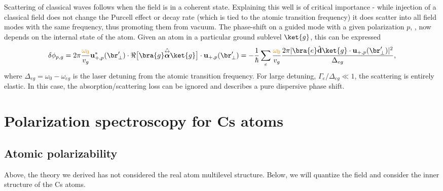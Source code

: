 \documentclass[]{report}
\newcommand{\tensor}[1]{\overset{\leftrightarrow}{#1}} %
\newcommand{\comment}[1]{{\color{orange} #1}}
\begin{document}
Scattering of classical waves follows when the field is in a coherent state.  \comment{Explaining this well is of critical importance - while injection of a classical field does not change the Purcell effect or decay rate (which is tied to the atomic transition frequency) it does scatter into all field modes with the same frequency, thus promoting them from vacuum}.  The phase-shift on a guided mode with a given polarization $p$, , now depends on the internal state of the atom.  Given an atom in a particular ground sublevel $\ket{g}$, this can be expressed \cite{LeKien2014a}
	\begin{equation} \label{Eq::PhaseShiftMultilevel}
		\delta  \phi_{p,g} =2\pi \frac{\comment{ \omega_{0}}}{v_g} \mathbf{u}^*_{+, p}(\br'_\perp) \cdot \Re \big[\bra{g} 
\hat{\tensor{\boldsymbol{\alpha}}} \ket{g} \big] \cdot \mathbf{u}_{+, p}(\br'_\perp) = -\frac{1}{\hbar} \sum_e \frac{ \comment{ \omega_{0} } }{v_g} \frac{2 \pi |\bra{e}\hat{\mathbf{d}}\ket{g} \cdot \mathbf{u}_{+,p}(\br'_\perp)|^2}{ \Delta_{eg} } ,
	\end{equation}
where $\Delta_{eg} = \omega_0 - \omega_{eg}$ is the laser detuning from the atomic transition frequency.  For large detuning, $\Gamma_{e}/\Delta_{eg} \ll 1$, the scattering is entirely elastic.  In this case, the absorption/scattering loss can be ignored and  describes a pure dispersive phase shift.

\section{Polarization spectroscopy for Cs atoms}
\subsection{Atomic polarizability}
Above, the theory we derived has not considered the real atom multilevel structure. Below, we will quantize the field and consider the inner structure of the Cs atoms.
\end{document}
